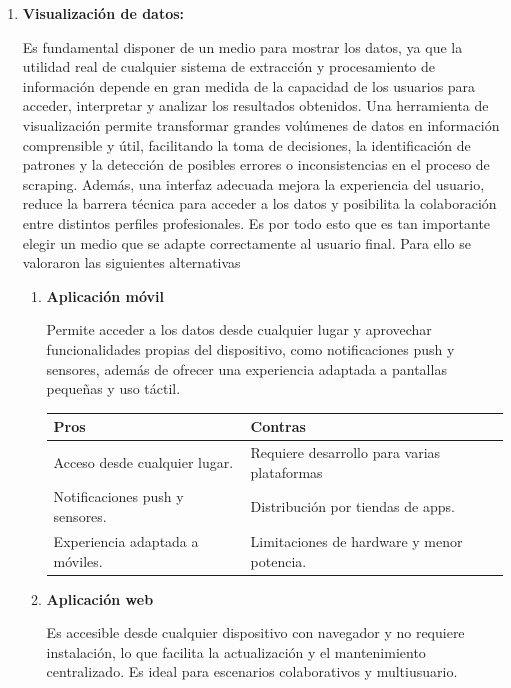 \documentclass{article}
\begin{document}
\begin{enumerate}
    \item \textbf{Visualización de datos:}
    
    Es fundamental disponer de un medio para mostrar los datos, ya que la utilidad real de cualquier sistema de extracción y procesamiento de información depende en gran medida de la capacidad de los usuarios para acceder, interpretar y analizar los resultados obtenidos. Una herramienta de visualización permite transformar grandes volúmenes de datos en información comprensible y útil, facilitando la toma de decisiones, la identificación de patrones y la detección de posibles errores o inconsistencias en el proceso de scraping. Además, una interfaz adecuada mejora la experiencia del usuario, reduce la barrera técnica para acceder a los datos y posibilita la colaboración entre distintos perfiles profesionales. Es por todo esto que es tan importante elegir un medio que se adapte correctamente al usuario final. Para ello se valoraron las siguientes alternativas
    \vspace{0.2cm}
    
    \begin{enumerate}[label=\arabic*.]
    
    \item \textbf{Aplicación móvil}
    
    Permite acceder a los datos desde cualquier lugar y aprovechar funcionalidades propias del dispositivo, como notificaciones push y sensores, además de ofrecer una experiencia adaptada a pantallas pequeñas y uso táctil.
    
    \medskip
    \begin{tabular}{p{6.5cm}  p{6.5cm}}
    \hline
    \textbf{Pros} & \textbf{Contras} \\
    \hline
        Acceso desde cualquier lugar. & Requiere desarrollo para varias plataformas \\
        Notificaciones push y sensores. & Distribución por tiendas de apps. \\
        Experiencia adaptada a móviles. & Limitaciones de hardware y menor potencia. \\    
        \hline

    \end{tabular}
    
    \medskip
    
    \vspace{0.2cm}
    \item \textbf{Aplicación web}
    
    Es accesible desde cualquier dispositivo con navegador y no requiere instalación, lo que facilita la actualización y el mantenimiento centralizado. Es ideal para escenarios colaborativos y multiusuario.
    

\end{enumerate}
\end{enumerate}
\end{document}
